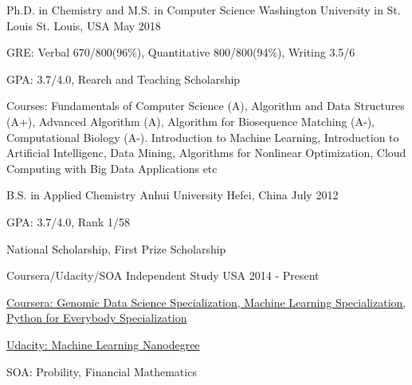 

\begin{cventries}

  \cventry
    {Ph.D. in Chemistry and M.S. in Computer Science} %
    {Washington University in St. Louis} %
    {St. Louis, USA} %
    {May 2018} %
    {
      \begin{cvitems} %
        \item {GRE: Verbal 670/800(96\%), Quantitative 800/800(94\%),  Writing 3.5/6 }
        \item {GPA: 3.7/4.0, Rearch and Teaching Scholarship}
        \item {Courses: Fundamentals of Computer Science (A), Algorithm and Data Structures (A+), Advanced Algorithm (A), Algorithm for Biosequence Matching (A-), Computational Biology (A-). Introduction to Machine Learning, Introduction to Artificial Intelligenc, Data Mining, Algorithms for Nonlinear Optimization, Cloud Computing with Big Data Applications etc}
      \end{cvitems}
    }


  \cventry
    {B.S. in Applied Chemistry}  %
    {Anhui University} %
    {Hefei, China} %
    {July 2012} %
    {
      \begin{cvitems} %
        \item {GPA: 3.7/4.0, Rank 1/58 }
        \item {National Scholarship, First Prize Scholarship}
      \end{cvitems}
    }

 \cventry
    {Coursera/Udacity/SOA}  %
    {Independent Study} %
    {USA} %
    {2014 - Present} %
    {
      \begin{cvitems} %
        \item {\href{https://github.com/lvchen727/coursera}{Coursera: Genomic Data Science Specialization, Machine Learning Specialization, Python for Everybody Specialization}}
        \item {\href{https://github.com/lvchen727/udacity-machine-learning}{Udacity: Machine Learning Nanodegree}}
		\item {SOA: Probility, Financial Mathematics}
      \end{cvitems}
    }

\end{cventries}
